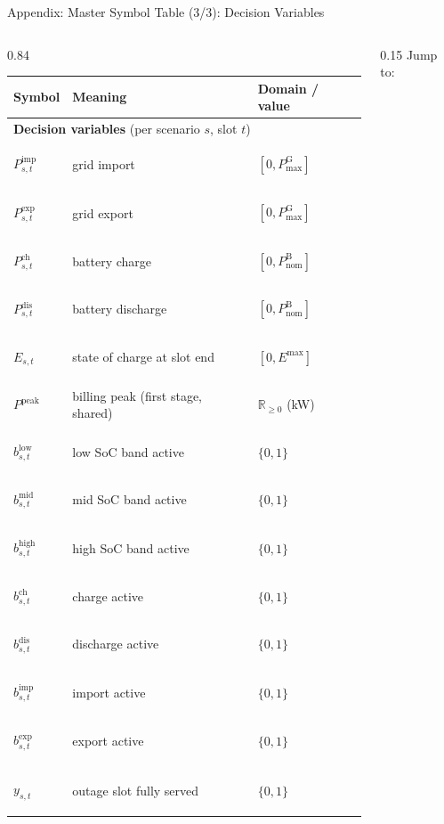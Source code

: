 \documentclass[aspectratio=169]{beamer}
\newcommand{\jumpbuttons}{%
  {\scriptsize Jump to:}\\[4pt]
  \hyperlink{nav:obj}{\beamerbutton{Objective}}\\[5pt]
  \hyperlink{nav:core}{\beamerbutton{Core}}\\[5pt]
  \hyperlink{nav:side}{\beamerbutton{Side}}}
\begin{document}
\begin{frame}{Appendix: Master Symbol Table (3/3): Decision Variables}
\begin{columns}[T]
\begin{column}{0.84\textwidth}
\centering\scriptsize
\begin{tabular}{lll}
\toprule
Symbol & Meaning & Domain / value \\
\midrule
\multicolumn{3}{l}{\textcolor{provVar}{\textbf{Decision variables}} (per scenario $s$, slot $t$)}\\
\hypertarget{sym:Pimp}{\textcolor{provVar}{$P^{\text{imp}}_{s,t}$}} & grid import & $[0,P^{\text{G}}_{\max}]$ \\
\hypertarget{sym:Pexp}{\textcolor{provVar}{$P^{\text{exp}}_{s,t}$}} & grid export & $[0,P^{\text{G}}_{\max}]$ \\
\hypertarget{sym:Pch}{\textcolor{provVar}{$P^{\text{ch}}_{s,t}$}} & battery charge & $[0,P^{\text{B}}_{\text{nom}}]$ \\
\hypertarget{sym:Pdis}{\textcolor{provVar}{$P^{\text{dis}}_{s,t}$}} & battery discharge & $[0,P^{\text{B}}_{\text{nom}}]$ \\
\hypertarget{sym:Esoc}{\textcolor{provVar}{$E_{s,t}$}} & state of charge at slot end & $[0,E^{\max}]$ \\
\hypertarget{sym:Ppeak}{\textcolor{provVar}{$P^{\text{peak}}$}} & billing peak (first stage, shared) & $\mathbb{R}_{\ge0}$ (kW) \\
\hypertarget{sym:blow}{\textcolor{provVar}{$b^{\text{low}}_{s,t}$}} & low SoC band active & $\{0,1\}$ \\
\hypertarget{sym:bmid}{\textcolor{provVar}{$b^{\text{mid}}_{s,t}$}} & mid SoC band active & $\{0,1\}$ \\
\hypertarget{sym:bhigh}{\textcolor{provVar}{$b^{\text{high}}_{s,t}$}} & high SoC band active & $\{0,1\}$ \\
\hypertarget{sym:bch}{\textcolor{provVar}{$b^{\text{ch}}_{s,t}$}} & charge active & $\{0,1\}$ \\
\hypertarget{sym:bdis}{\textcolor{provVar}{$b^{\text{dis}}_{s,t}$}} & discharge active & $\{0,1\}$ \\
\hypertarget{sym:bimp}{\textcolor{provVar}{$b^{\text{imp}}_{s,t}$}} & import active & $\{0,1\}$ \\
\hypertarget{sym:bexp}{\textcolor{provVar}{$b^{\text{exp}}_{s,t}$}} & export active & $\{0,1\}$ \\
\hypertarget{sym:yserved}{\textcolor{provVar}{$y_{s,t}$}} & outage slot fully served & $\{0,1\}$ \\
\bottomrule
\end{tabular}
\end{column}
\begin{column}{0.15\textwidth}
\vspace{1.2cm}
\jumpbuttons
\end{column}
\end{columns}
\end{frame}
\end{document}
